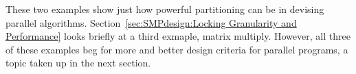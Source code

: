 These two examples show just how powerful partitioning can be in
devising parallel algorithms.
Section~\ref{sec:SMPdesign:Locking Granularity and Performance}
looks briefly at a third exmaple, matrix multiply.
However, all three of these examples beg for more and better design
criteria for parallel programs, a topic taken up in the next section.
